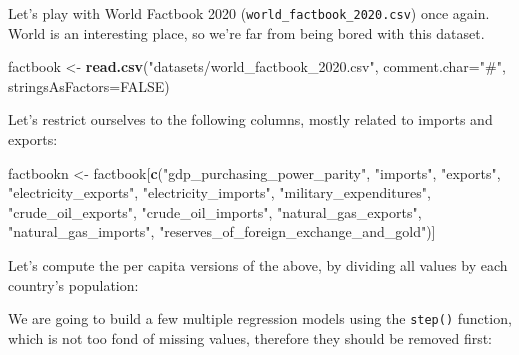 \documentclass[10pt,b5paper,krantz1]{krantz}
\newenvironment{Shaded}{\begin{snugshade}}{\end{snugshade}}
\newcommand{\ControlFlowTok}[1]{\textcolor[rgb]{0.27,0.27,0.27}{\textbf{#1}}}
\newcommand{\DataTypeTok}[1]{\textcolor[rgb]{0.27,0.27,0.27}{#1}}
\newcommand{\DecValTok}[1]{\textcolor[rgb]{0.06,0.06,0.06}{#1}}
\newcommand{\KeywordTok}[1]{\textcolor[rgb]{0.27,0.27,0.27}{\textbf{#1}}}
\newcommand{\NormalTok}[1]{#1}
\newcommand{\OperatorTok}[1]{\textcolor[rgb]{0.43,0.43,0.43}{\textbf{#1}}}
\newcommand{\OtherTok}[1]{\textcolor[rgb]{0.37,0.37,0.37}{#1}}
\newcommand{\StringTok}[1]{\textcolor[rgb]{0.5,0.5,0.5}{#1}}
\begin{document}
Let's play with World Factbook 2020
(\texttt{world\_factbook\_2020.csv}) once again.
World is an interesting place, so we're far from being bored with this dataset.

\begin{Shaded}
\begin{Highlighting}[]
\NormalTok{factbook <-}\StringTok{ }\KeywordTok{read.csv}\NormalTok{(}\StringTok{"datasets/world_factbook_2020.csv"}\NormalTok{,}
    \DataTypeTok{comment.char=}\StringTok{"#"}\NormalTok{, }\DataTypeTok{stringsAsFactors=}\OtherTok{FALSE}\NormalTok{)}
\end{Highlighting}
\end{Shaded}

Let's restrict ourselves to the following columns, mostly
related to imports and exports:

\begin{Shaded}
\begin{Highlighting}[]
\NormalTok{factbookn <-}\StringTok{ }\NormalTok{factbook[}\KeywordTok{c}\NormalTok{(}\StringTok{"gdp_purchasing_power_parity"}\NormalTok{,}
    \StringTok{"imports"}\NormalTok{, }\StringTok{"exports"}\NormalTok{, }\StringTok{"electricity_exports"}\NormalTok{,}
    \StringTok{"electricity_imports"}\NormalTok{, }\StringTok{"military_expenditures"}\NormalTok{,}
    \StringTok{"crude_oil_exports"}\NormalTok{, }\StringTok{"crude_oil_imports"}\NormalTok{,}
    \StringTok{"natural_gas_exports"}\NormalTok{, }\StringTok{"natural_gas_imports"}\NormalTok{,}
    \StringTok{"reserves_of_foreign_exchange_and_gold"}\NormalTok{)]}
\end{Highlighting}
\end{Shaded}

Let's compute the per capita versions of the above, by dividing
all values by each country's population:

\begin{Shaded}
\end{Shaded}

We are going to build a few multiple regression models using the
\texttt{step()} function, which is not too fond of missing values, therefore
they should be removed first:
\end{document}
